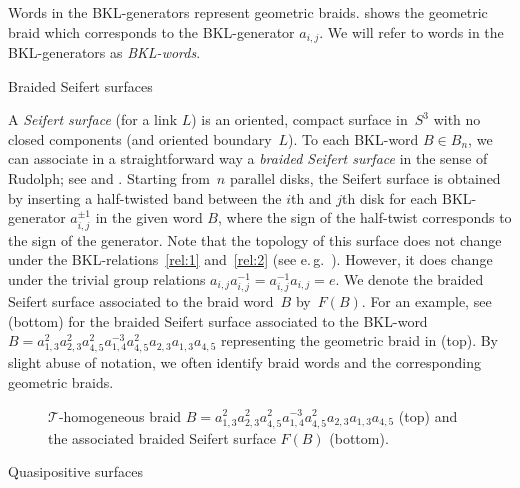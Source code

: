 \documentclass{amsart}
\makeatletter
\renewcommand\subsection{\@startsection{subsection}{2}%
  \z@{-.5\linespacing\@plus-.7\linespacing}{.5\linespacing}%
  {\normalfont\scshape}}
\theoremstyle{definition}
\theoremstyle{remark}
\theoremstyle{plain}
\newcommand{\eg}{e.\,g.~}
\newcommand{\T}{\mathcal{T}}
\newcommand{\sigij}{a_{i,j}}
\makeatother
\begin{document}
Words in the BKL-generators represent geometric braids.  shows the geometric braid which corresponds to the BKL-generator $\sigij$. We will refer to words in the BKL-generators as \emph{BKL-words}. 

\subsection{Braided Seifert surfaces}\label{subsubsec:braided_surf}

A \emph{Seifert surface} (for a link $L$) is an oriented, compact surface in~$S^3$ with no closed components (and oriented boundary~$L$). To each BKL-word $B \in B_n$, we can associate in a straightforward way a \emph{braided Seifert surface} in the sense of Rudolph; see \cite[Section 5.4]{Rudolph_Hopf_plumbing} and \cite[Section 2]{rudolph_braidedsurfaces}. Starting from~$n$ parallel disks, the Seifert surface is obtained by inserting a half-twisted band between the $i$th and $j$th disk for each BKL-generator $\sigij^{\pm 1}$ in the given word $B$, where the sign of the half-twist corresponds to the sign of the generator. Note that the topology of this surface does not change under the BKL-relations~\eqref{rel:1} and~\eqref{rel:2} (see \eg \cite[Figure~1]{birmankolee}). However, it does change under the trivial group relations $\sigij\sigij^{-1} = \sigij^{-1}\sigij = e$. We denote the braided Seifert surface associated to the braid word~$B$ by~$F(B)$. For an example, see  (bottom) for the braided Seifert surface associated to the BKL-word $B = a_{1,3}^2 a_{2,3}^2 a_{4,5}^2 a_{1,4}^{-3} a_{4,5}^2 a_{2,3} a_{1,3} a_{4,5}$ representing the geometric braid in  (top).
By slight abuse of notation, we often identify braid words and the corresponding geometric braids.

\begin{figure}[htbp] 
     \centering
     \def\svgwidth{0,9\columnwidth}
	  
	\caption{$\T$-homogeneous braid $B = a_{1,3}^2 a_{2,3}^2 a_{4,5}^2 a_{1,4}^{-3} a_{4,5}^2 a_{2,3} a_{1,3} a_{4,5}$ (top) and the associated braided Seifert surface $F(B)$ (bottom).}
    \label{fig:seifsurf_T-homo}
\end{figure}

\subsection{Quasipositive surfaces}\label{sec:qp}
\end{document}
